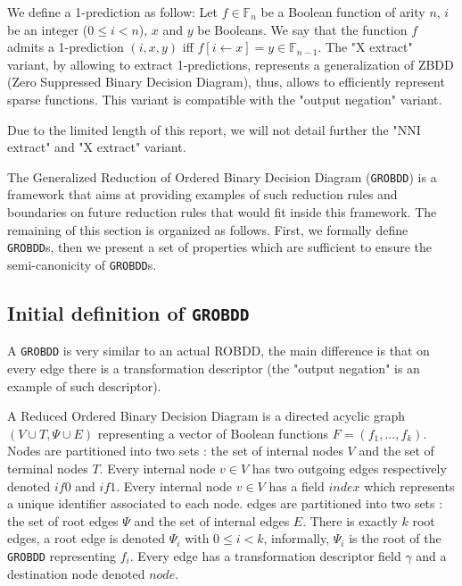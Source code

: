 \documentclass[a4paper,10pt]{article}
\newcommand{\F}{\mathbb{F}}
\newcommand{\GroBdd}{\texttt{GROBDD}}
\begin{document}
We define a 1-prediction as follow:
Let $f\in\F_n$ be a Boolean function of arity $n$, $i$ be an integer ($0\leq i < n$), $x$ and $y$ be Booleans.
We say that the function $f$ admits a 1-prediction $(i, x, y)$ iff $f[i\leftarrow x] = y \in\F_{n-1}$.
The "X extract" variant, by allowing to extract 1-predictions, represents a generalization of ZBDD (Zero Suppressed Binary Decision Diagram), thus, allows to efficiently represent sparse functions.
This variant is compatible with the "output negation" variant.


Due to the limited length of this report, we will not detail further the "NNI extract" and "X extract" variant.


The Generalized Reduction of Ordered Binary Decision Diagram (\GroBdd{}) is a framework that aims at providing examples of such reduction rules and boundaries on future reduction rules that would fit inside this framework.
The remaining of this section is organized as follows. First, we formally define \GroBdd{}s, then we present a set of properties which are sufficient to ensure the semi-canonicity of \GroBdd{}s.

\subsection{Initial definition of \GroBdd{}}

A \GroBdd{} is very similar to an actual ROBDD, the main difference is that on every edge there is a transformation  descriptor (the "output negation" is an example of such descriptor).

A Reduced Ordered Binary Decision Diagram is a directed acyclic graph $(V\cup T, \Psi \cup E)$ representing a vector of Boolean functions $F=(f_1, ..., f_k)$.
Nodes are partitioned into two sets : the set of internal nodes $V$ and the set of terminal nodes $T$.
Every internal node $v\in V$ has two outgoing edges respectively denoted $\mathit{if0}$ and $\mathit{if1}$.
Every internal node $v\in V$ has a field $\mathit{index}$ which represents a unique identifier associated to each node.
edges are partitioned into two sets : the set of root edges $\Psi$ and the set of internal edges $E$.
There is exactly $k$ root edges, a root edge is denoted $\Psi_i$ with $0\leq i < k$, informally, $\Psi_i$ is the root of the \GroBdd{} representing $f_i$.
Every edge has a transformation descriptor field $\gamma$ and a destination node denoted $\mathit{node}$.
\end{document}
